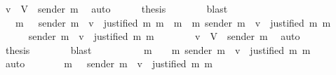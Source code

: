 \begin{isabellebody}
\ {\isacartoucheopen}v\ {\isasymin}\ V\ {\isacharminus}\ {\isacharbraceleft}sender\ m{\isacharprime}{\isacharbraceright}{\isacartoucheclose}\ \isamarkupfalse%
\ auto\isanewline
\ \ \ \ \isamarkupfalse%
\ {\isacharquery}thesis\isanewline
\ \ \ \ \ \ \isamarkupfalse%
\ blast\isanewline
\ \ \isamarkupfalse%
\isanewline
\ \ \isamarkupfalse%
\ \isamarkupfalse%
\ {\isachardoublequoteopen}{\isasymdots}\ {\isacharequal}\ {\isacharbraceleft}m{\isacharprime}{\isacharprime}\ {\isasymin}\ {\isasymsigma}{\isachardot}\ sender\ m{\isacharprime}{\isacharprime}\ {\isacharequal}\ v\ {\isasymand}\ justified\ m\ m{\isacharprime}{\isacharprime}{\isacharbraceright}\ {\isasymunion}\ {\isacharbraceleft}m{\isacharprime}{\isacharprime}\ {\isasymin}\ {\isacharbraceleft}m{\isacharprime}{\isacharbraceright}{\isachardot}\ sender\ m{\isacharprime}{\isacharprime}\ {\isacharequal}\ v\ {\isasymand}\ justified\ m\ m{\isacharprime}{\isacharprime}{\isacharbraceright}{\isachardoublequoteclose}\isanewline
\ \ \isamarkupfalse%
{\isacharminus}\isanewline
\ \ \ \ \isamarkupfalse%
\ {\isachardoublequoteopen}sender\ m{\isacharprime}\ {\isacharequal}\ v\ {\isasymLongrightarrow}\ justified\ m\ m{\isacharprime}{\isachardoublequoteclose}\isanewline
\ \ \ \ \ \ \isamarkupfalse%
\ {\isacartoucheopen}v\ {\isasymin}\ V\ {\isacharminus}\ {\isacharbraceleft}sender\ m{\isacharprime}{\isacharbraceright}{\isacartoucheclose}\ \isamarkupfalse%
\ auto\isanewline
\ \ \ \ \isamarkupfalse%
\ {\isacharquery}thesis\isanewline
\ \ \ \ \ \ \isamarkupfalse%
\ blast\isanewline
\ \ \isamarkupfalse%
\isanewline
\ \ \isamarkupfalse%
\ \isamarkupfalse%
\ {\isachardoublequoteopen}{\isasymdots}\ {\isacharequal}\ {\isacharbraceleft}m{\isacharprime}{\isacharprime}\ {\isasymin}\ {\isasymsigma}\ {\isasymunion}\ {\isacharbraceleft}m{\isacharprime}{\isacharbraceright}{\isachardot}\ sender\ m{\isacharprime}{\isacharprime}\ {\isacharequal}\ v\ {\isasymand}\ justified\ m\ m{\isacharprime}{\isacharprime}{\isacharbraceright}{\isachardoublequoteclose}\isanewline
\ \ \ \ \isamarkupfalse%
\ auto\isanewline
\ \ \isamarkupfalse%
\ \isamarkupfalse%
\ {\isachardoublequoteopen}{\isasymdots}\ {\isacharequal}\ {\isacharbraceleft}m{\isacharprime}{\isacharprime}\ {\isasymin}\ {\isasymsigma}{\isacharprime}{\isachardot}\ sender\ m{\isacharprime}{\isacharprime}\ {\isacharequal}\ v\ {\isasymand}\ justified\ m\ m{\isacharprime}{\isacharprime}{\isacharbraceright}{\isachardoublequoteclose}\isanewline

\end{isabellebody}
